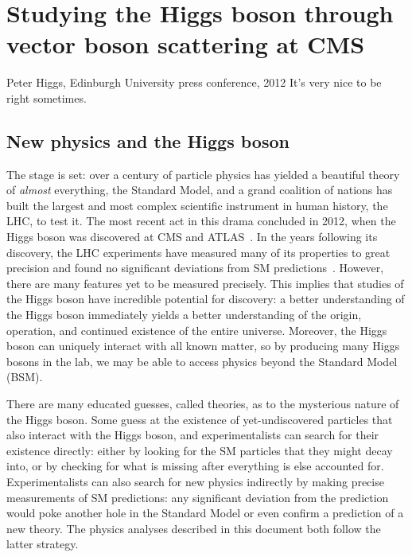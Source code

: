 \chapter{Studying the Higgs boson through vector boson scattering at CMS}\label{ch:higgs_vbs}
\begin{aquote}{Peter Higgs, Edinburgh University press conference, 2012}
    It's very nice to be right sometimes.
\end{aquote}

\section{New physics and the Higgs boson}
The stage is set: over a century of particle physics has yielded a beautiful theory of \textit{almost} everything, the Standard Model, and a grand coalition of nations has built the largest and most complex scientific instrument in human history, the LHC, to test it. 
The most recent act in this drama concluded in 2012, when the Higgs boson was discovered at CMS and ATLAS~\cite{CMSdisc, ATLASdisc}. 
In the years following its discovery, the LHC experiments have measured many of its properties to great precision and found no significant deviations from SM predictions~\cite{NatureHiggsCMS2022, NatureHiggsATLAS2022}. 
However, there are many features yet to be measured precisely. 
This implies that studies of the Higgs boson have incredible potential for discovery: a better understanding of the Higgs boson immediately yields a better understanding of the origin, operation, and continued existence of the entire universe. 
Moreover, the Higgs boson can uniquely interact with all known matter, so by producing many Higgs bosons in the lab, we may be able to access physics beyond the Standard Model (BSM). %

There are many educated guesses, called theories, as to the mysterious nature of the Higgs boson. 
Some guess at the existence of yet-undiscovered particles that also interact with the Higgs boson\footnotemark{}, and experimentalists can search for their existence directly: either by looking for the SM particles that they might decay into, or by checking for what is missing after everything is else accounted for. 
Experimentalists can also search for new physics indirectly by making precise measurements of SM predictions: any significant deviation from the prediction would poke another hole in the Standard Model or even confirm a prediction of a new theory. 
The physics analyses described in this document both follow the latter strategy.

